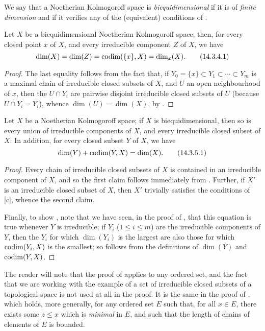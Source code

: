 We say that a Noetherian Kolmogoroff space is \emph{biequidimensional} if it is of \emph{finite dimension} and if it verifies any of the (equivalent) conditions of .

\begin{corollary}[14.3.4]
\label{0.14.3.4}
Let $X$ be a biequidimensional Noetherian Kolmogoroff space;
then, for every closed point $x$ of $X$, and every irreducible component $Z$ of $X$, we have
\[
\label{0.14.3.4.1}
  \dim(X)=\dim(Z)=\operatorname{codim}(\{x\},X)=\dim_x(X).
  \tag{14.3.4.1}
\]
\end{corollary}

\begin{proof}
The last equality follows from the fact that, if $Y_0=\{x\}\subset Y_1\subset\cdots\subset Y_m$ is a maximal chain of irreducible closed subsets of $X$, and $U$ an open neighbourhood of $x$, then the $U\cap Y_i$ are pairwise disjoint irreducible closed subsets of $U$ (because $\overline{U\cap Y_i}=Y_i$), whence $\dim(U)=\dim(X)$, by .
\end{proof}

\begin{corollary}[14.3.5]
\label{0.14.3.5}
Let $X$ be a Noetherian Kolmogoroff space; if $X$ is biequidimensional, then so is every union of irreducible components of $X$, and every irreducible closed subset of $X$.
In addition, for every closed subset $Y$ of $X$, we have
\[
\label{0.14.3.5.1}
  \dim(Y)+\operatorname{codim}(Y,X)=\dim(X).
  \tag{14.3.5.1}
\]
\end{corollary}

\begin{proof}
Every chain of irreducible closed subsets of $X$ is contained in an irreducible component of $X$, and so the first claim follows immediately from .
Further, if $X'$ is an irreducible closed subset of $X$, then $X'$ trivially satisfies the conditions of [c], whence the second claim.

Finally, to show , note that we have seen, in the proof of , that this equation is true whenever $Y$ is irreducible;
if $Y_i$ ($1\leq i\leq m$) are the irreducible components of $Y$, then the $Y_i$ for which $\dim(Y_i)$ is the largest are also those for which $\operatorname{codim}(Y_i,X)$ is the smallest;
so  follows from the definitions of $\dim(Y)$ and $\operatorname{codim}(Y,X)$.
\end{proof}

\begin{remark}[14.3.6]
\label{0.14.3.6}
The reader will note that the proof of  applies to any ordered set, and the fact that we are working with the example of a set of irreducible closed subsets of a topological space is not used at all in the proof.
It is the same in the proof of , which holds, more generally, for any ordered set $E$ such that, for all $x\in E$, there exists some $z\leq x$ which is \emph{minimal} in $E$, and such that the length of chains of elements of $E$ is bounded.
\end{remark}

